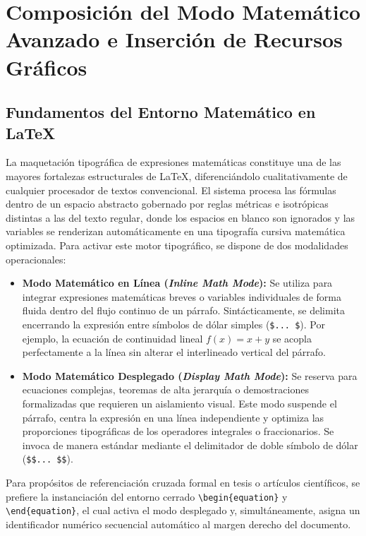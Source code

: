 \section{Composición del Modo Matemático Avanzado e Inserción de Recursos Gráficos}

\subsection{Fundamentos del Entorno Matemático en \LaTeX}
La maquetación tipográfica de expresiones matemáticas constituye una de las mayores fortalezas estructurales de \LaTeX, diferenciándolo cualitativamente de cualquier procesador de textos convencional. El sistema procesa las fórmulas dentro de un espacio abstracto gobernado por reglas métricas e isotrópicas distintas a las del texto regular, donde los espacios en blanco son ignorados y las variables se renderizan automáticamente en una tipografía cursiva matemática optimizada. Para activar este motor tipográfico, se dispone de dos modalidades operacionales:

\begin{itemize}
    \item \textbf{Modo Matemático en Línea (\textit{Inline Math Mode}):} Se utiliza para integrar expresiones matemáticas breves o variables individuales de forma fluida dentro del flujo continuo de un párrafo. Sintácticamente, se delimita encerrando la expresión entre símbolos de dólar simples (\texttt{\$... \$}). Por ejemplo, la ecuación de continuidad lineal $f(x) = x + y$ se acopla perfectamente a la línea sin alterar el interlineado vertical del párrafo.
    
    \item \textbf{Modo Matemático Desplegado (\textit{Display Math Mode}):} Se reserva para ecuaciones complejas, teoremas de alta jerarquía o demostraciones formalizadas que requieren un aislamiento visual. Este modo suspende el párrafo, centra la expresión en una línea independiente y optimiza las proporciones tipográficas de los operadores integrales o fraccionarios. Se invoca de manera estándar mediante el delimitador de doble símbolo de dólar (\texttt{\$\$... \$\$}). 
\end{itemize}

Para propósitos de referenciación cruzada formal en tesis o artículos científicos, se prefiere la instanciación del entorno cerrado \texttt{\textbackslash begin\{equation\}} y \texttt{\textbackslash end\{equation\}}, el cual activa el modo desplegado y, simultáneamente, asigna un identificador numérico secuencial automático al margen derecho del documento.

